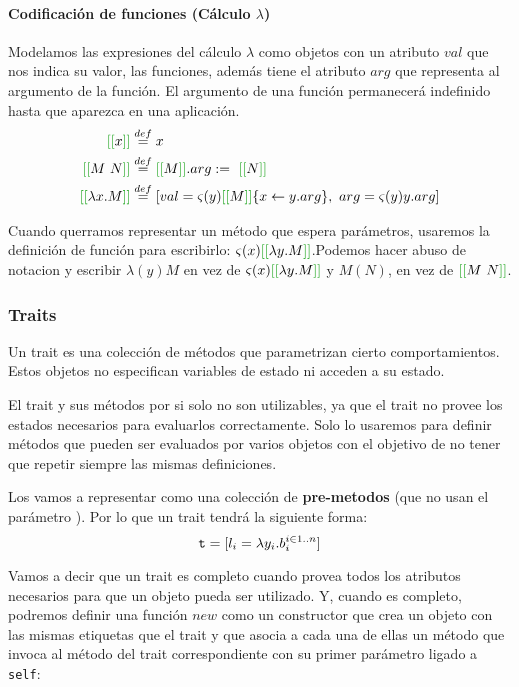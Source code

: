 \paragraph{Codificación de funciones (Cálculo $\lambda$)}
Modelamos las expresiones del cálculo $\lambda$ como objetos con un atributo $val$ que nos indica su valor, las funciones, además tiene el atributo $arg$ que representa al argumento de la función. El argumento de una función permanecerá indefinido hasta que aparezca en una aplicación.
\begin{align*}
\OORep{x} &\equalDef x\\
\OORep{M~N} &\equalDef \OORep{M}.arg :=~\OORep{N}\\
\OORep{\lambdaAbsI{x}{M}} &\equalDef 
[\OOAtributo{val}{y}{\OORep{M}\{x\leftarrow y.arg\}},~\OOAtributo{arg}{y}{y.arg}]\\
\end{align*}

Cuando querramos representar un método que espera parámetros, usaremos la definición de función para escribirlo: $\varsigma(x)\OORep {\lambdaAbsI{y}{M}}$.Podemos hacer abuso de notacion y escribir $\lambda(y)M$ en vez de $\varsigma(x)\OORep {\lambdaAbsI{y}{M}}$ y $M(N)$, en vez de $\OORep{M~N}$.

\subsubsection{Traits}
Un trait es una colección de métodos que parametrizan cierto comportamientos. Estos objetos no especifican variables de estado ni acceden a su estado.

El trait y sus métodos por si solo no son utilizables, ya que el trait no provee los estados necesarios para evaluarlos correctamente. Solo lo usaremos para definir métodos que pueden ser evaluados por varios objetos con el objetivo de no tener que repetir siempre las mismas definiciones.

Los vamos a representar como una colección de \textbf{pre-metodos} (que no usan el parámetro ). Por lo que un trait tendrá la siguiente forma:
$$\texttt{t} = [l_i = \lambda y_i. b_i^{i\in 1..n}]$$

Vamos a decir que un trait es completo cuando provea todos los atributos necesarios para que un objeto pueda ser utilizado. Y, cuando es completo, podremos definir una función $new$ como un constructor que crea un objeto con las mismas etiquetas que el trait y que asocia a cada una de ellas un método que invoca al método del trait correspondiente con su primer parámetro ligado a \texttt{self}:

